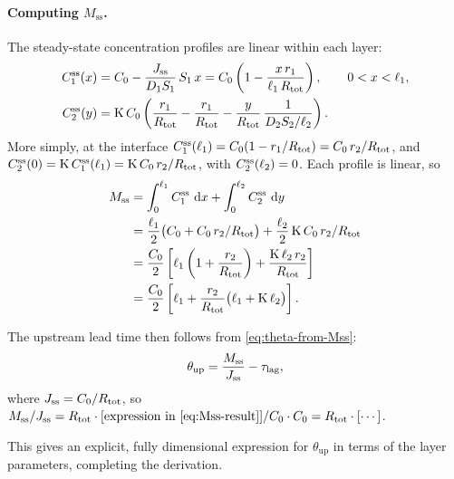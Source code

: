 \paragraph{Computing $M_{\mathrm{ss}}$.}
The steady-state concentration profiles are linear within each layer:
\begin{align}
  C_1^{\mathrm{ss}}(x) &= C_0 - \frac{J_{\mathrm{ss}}}{D_{1}S_{1}}\,S_{1}\,x
  = C_0\left(1 - \frac{x\,r_1}{\ell_{1}\,R_{\mathrm{tot}}}\right),
  \qquad 0 < x < \ell_{1},\\
  C_2^{\mathrm{ss}}(y) &= \mathrm{K}\,C_0
  \left(\frac{r_1}{R_{\mathrm{tot}}} - \frac{r_1}{R_{\mathrm{tot}}}
  - \frac{y}{R_{\mathrm{tot}}}\,\frac{1}{D_{2}S_{2}/\ell_{2}}
  \right).
\end{align}
More simply, at the interface $C_1^{\mathrm{ss}}(\ell_{1}) = C_0(1 -
r_1/R_{\mathrm{tot}}) = C_0\,r_2/R_{\mathrm{tot}}$, and
$C_2^{\mathrm{ss}}(0) = \mathrm{K}\,C_1^{\mathrm{ss}}(\ell_{1})
= \mathrm{K}\,C_0\,r_2/R_{\mathrm{tot}}$, with $C_2^{\mathrm{ss}}(\ell_{2}) = 0$.
Each profile is linear, so
\begin{align}
  M_{\mathrm{ss}} &= \int_0^{\ell_{1}} C_1^{\mathrm{ss}}\,\dd{x}
  + \int_0^{\ell_{2}} C_2^{\mathrm{ss}}\,\dd{y}
  \notag\\
  &= \frac{\ell_{1}}{2}\bigl(C_0 + C_0\,r_2/R_{\mathrm{tot}}\bigr)
  + \frac{\ell_{2}}{2}\,\mathrm{K}\,C_0\,r_2/R_{\mathrm{tot}}
  \notag\\
  &= \frac{C_0}{2}\left[\ell_{1}\left(1 + \frac{r_2}{R_{\mathrm{tot}}}\right)
  + \frac{\mathrm{K}\,\ell_{2}\,r_2}{R_{\mathrm{tot}}}\right]
  \notag\\
  &= \frac{C_0}{2}\left[\ell_{1}
  + \frac{r_2}{R_{\mathrm{tot}}}\bigl(\ell_{1} + \mathrm{K}\,\ell_{2}\bigr)
  \right].
  \label{eq:Mss-result}
\end{align}

The upstream lead time then follows from \cref{eq:theta-from-Mss}:
\begin{equation}
  \theta_{\mathrm{up}} = \frac{M_{\mathrm{ss}}}{J_{\mathrm{ss}}} - \tau_{\mathrm{lag}},
\end{equation}
where $J_{\mathrm{ss}} = C_0/R_{\mathrm{tot}}$, so
$M_{\mathrm{ss}}/\Jss = R_{\mathrm{tot}}\cdot[\text{expression in
\cref{eq:Mss-result}}]/C_0\cdot C_0 = R_{\mathrm{tot}}\cdot[\cdots]$.

This gives an explicit, fully dimensional expression for $\theta_{\mathrm{up}}$
in terms of the layer parameters, completing the derivation.

